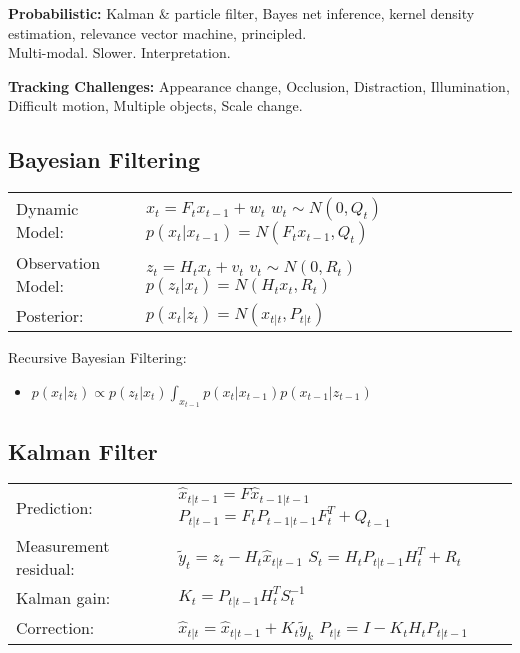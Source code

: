 \documentclass{../cheat}
\begin{document}
\begin{multicols}{3}
		\textbf{Probabilistic:}
		Kalman \& particle filter, Bayes net inference, kernel density estimation, relevance vector machine, principled.\\
		 Multi-modal.
		 Slower.
		 Interpretation.

	\textbf{Tracking Challenges:} Appearance change, Occlusion, Distraction, Illumination, Difficult motion, Multiple objects, Scale change.
\subsection{Bayesian Filtering}

	\begin{tabularx}{\columnwidth}{l X}
		Dynamic Model:& $x_t=F_t x_{t-1}+w_t$ \newline
		$w_t \sim N(0,Q_t)$ \newline $p(x_t|x_{t-1})=N(F_t x_{t-1}, Q_t)$\\
		Observation Model:& $z_t=H_t x_t+v_t$ \newline
		 $v_t \sim N(0,R_t)$ \newline $p(z_t|x_t)=N(H_t x_t, R_t)$\\
		Posterior:& $p(x_t|z_t)=N(x_{t|t}, P_{t|t})$\\
	\end{tabularx}

	Recursive Bayesian Filtering:
	\begin{itemize}[nolistsep, leftmargin=1em]
		\item $p(x_t|z_t)\varpropto p(z_t|x_t) \int_{x_{t-1}}{p(x_t|x_{t-1}) p(x_{t-1}|z_{t-1})}$
	\end{itemize}
			
\subsection{Kalman Filter}
\begin{tabularx}{\columnwidth}{l X}
	Prediction:&  $\hat{x}_{t|t-1}=F\hat{x}_{t-1|t-1}$ \newline
		$P_{t|t-1}=F_t P_{t-1|t-1} F_t^T+Q_{t-1}$\\
	Measurement residual:& $\tilde{y}_t=z_t-H_t \hat{x}_{t|t-1}$ \newline
		$S_t=H_t P_{t|t-1} H_t^T+R_t$\\
	Kalman gain:& $K_t= P_{t|t-1}H_t^T S_t^{-1}$\\
	Correction:& $\hat{x}_{t|t}=\hat{x}_{t|t-1}+K_t \tilde{y}_k$ \newline
		$P_{t|t}=I-K_t H_t P_{t|t-1}$\\
\end{tabularx}


\end{multicols}
\end{document}
